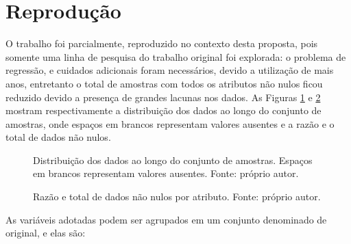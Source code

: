 \section{Reprodução}\label{se:rep}

O trabalho \cite{REZENDE:2009} foi parcialmente, reproduzido no contexto desta proposta, pois somente uma linha de pesquisa do trabalho original foi explorada: o problema de regressão, e cuidados adicionais foram necessários, devido a utilização de mais anos, entretanto o total de amostras com todos os atributos não nulos ficou reduzido devido a presença de grandes lacunas nos dados. As Figuras \ref{fig:distribution} e \ref{fig:nulltotal} mostram respectivamente a distribuição dos dados ao longo do conjunto de amostras, onde espaços em brancos representam valores ausentes e a razão e o total de dados não nulos.

\begin{figure}[H]
\centering
{}
\caption{Distribuição dos dados ao longo do conjunto de amostras. Espaços em brancos representam valores ausentes. Fonte: próprio autor.}
\label{fig:distribution}
\end{figure}

\begin{figure}[H]
\centering
{}
\caption{Razão e total de dados não nulos por atributo. Fonte: próprio autor.}
\label{fig:nulltotal}
\end{figure}

As variáveis adotadas podem ser agrupados em um conjunto denominado de original, e elas são:

